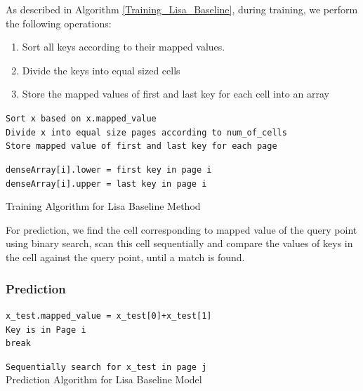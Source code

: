 As described in Algorithm \ref{Training_Lisa_Baseline}, during training, we perform the following operations:

\begin{enumerate}
	\item Sort all keys according to their mapped values.
	\item Divide the keys into equal sized cells
	\item Store the mapped values of first and last key for each cell into an array
\end{enumerate}



\begin{algorithm}[H]
    \SetAlgoLined
     \texttt{Sort x based on x.mapped\_value}\\
     \texttt{Divide x into equal size pages according to num\_of\_cells}\\
     \texttt{Store mapped value of first and last key for each page }\\
     {
         \texttt{denseArray[i].lower = first key in page i  } \\
		 \texttt{denseArray[i].upper = last key in page i  }
		
     }
     \caption{Training Algorithm for Lisa Baseline Method}
     \label{Training_Lisa_Baseline}
\end{algorithm}

For prediction, we find the cell corresponding to mapped value of the query point using binary search, scan this cell sequentially and compare the values of keys in the cell against the query point, until a match is found.

\subsubsection{Prediction}

\begin{algorithm}[H]
    \SetAlgoLined
    \texttt{x\_test.mapped\_value = x\_test[0]+x\_test[1] } \\
    {
        {
		    \texttt{Key is in Page i } \\
		    \texttt{break }
		}
    }
  
 	 \texttt{Sequentially search for x\_test in page j} \\
     \caption{Prediction Algorithm for Lisa Baseline Model }
\end{algorithm}


